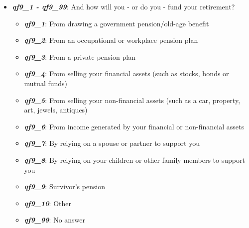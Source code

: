 \documentclass[a4paper,11pt]{article}
\begin{document}
\begin{itemize}
    \item \textit{\textbf{qf9\_1 - qf9\_99}}: And how will you - or do you - fund your retirement? 
    \begin{itemize}
        \item \textit{\textbf{qf9\_1}}: From drawing a government pension/old-age benefit 
        \item \textit{\textbf{qf9\_2}}: From an occupational or workplace pension plan 
        \item \textit{\textbf{qf9\_3}}: From a private pension plan
        \item \textit{\textbf{qf9\_4}}: From selling your financial assets (such as stocks, bonds or mutual funds)
        \item \textit{\textbf{qf9\_5}}: From selling your non-financial assets (such as a car, property, art, jewels, antiques)
        \item \textit{\textbf{qf9\_6}}: From income generated by your financial or non-financial assets
        \item \textit{\textbf{qf9\_7}}: By relying on a spouse or partner to support you
        \item \textit{\textbf{qf9\_8}}: By relying on your children or other family members to support you
        \item \textit{\textbf{qf9\_9}}: Survivor’s pension
        \item \textit{\textbf{qf9\_10}}: Other
        \item \textit{\textbf{qf9\_99}}: No answer
    \end{itemize}
    

\end{itemize}
\end{document}
